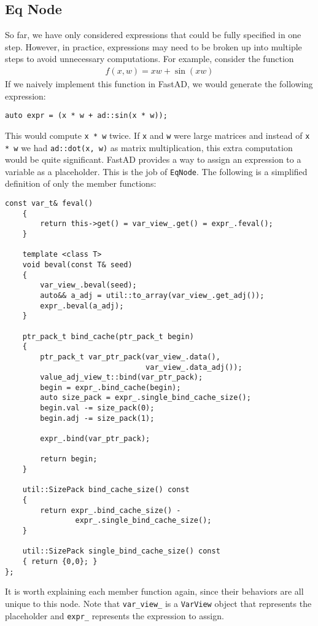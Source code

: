 \subsection{Eq Node}\label{ssec:eq}

So far, we have only considered expressions that could be fully specified in one step.
However, in practice, expressions may need to be broken up into multiple steps
to avoid unnecessary computations.
For example, consider the function
\begin{align}
    f(x,w) = xw + \sin(xw) \label{eq:eq-example}
\end{align}
If we naively implement this function in FastAD, 
we would generate the following expression:
\begin{lstlisting}[style=customcpp]
    auto expr = (x * w + ad::sin(x * w));
\end{lstlisting}
This would compute \verb|x * w| twice.
If \verb|x| and \verb|w| were large matrices and instead of \verb|x * w|
we had \verb|ad::dot(x, w)| as matrix multiplication,
this extra computation would be quite significant.
FastAD provides a way to assign an expression to a variable as a placeholder.
This is the job of \verb|EqNode|.
The following is a simplified definition of only the member functions:
\begin{lstlisting}[style=customcpp]
    const var_t& feval()
    {
        return this->get() = var_view_.get() = expr_.feval();
    }

    template <class T>
    void beval(const T& seed)
    {
        var_view_.beval(seed);
        auto&& a_adj = util::to_array(var_view_.get_adj());
        expr_.beval(a_adj);
    }

    ptr_pack_t bind_cache(ptr_pack_t begin)
    {
        ptr_pack_t var_ptr_pack(var_view_.data(), 
                                var_view_.data_adj());
        value_adj_view_t::bind(var_ptr_pack);
        begin = expr_.bind_cache(begin);
        auto size_pack = expr_.single_bind_cache_size();
        begin.val -= size_pack(0);
        begin.adj -= size_pack(1);

        expr_.bind(var_ptr_pack);

        return begin;
    }

    util::SizePack bind_cache_size() const 
    { 
        return expr_.bind_cache_size() - 
                expr_.single_bind_cache_size();
    }

    util::SizePack single_bind_cache_size() const 
    { return {0,0}; }
};
\end{lstlisting}
It is worth explaining each member function again, 
since their behaviors are all unique to this node.
Note that \verb|var_view_| is a \verb|VarView| object that represents the placeholder
and \verb|expr_| represents the expression to assign.

